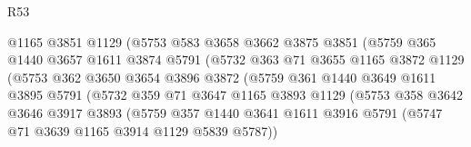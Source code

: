 \begin{lexlean}{R53}
\begin{coremodule}
                                @1165
                                @3851
                                @1129
                                (@5753
                                  @583
                                  @3658
                                  @3662
                                  @3875
                                  @3851
                                  (@5759
                                    @365
                                    @1440
                                    @3657
                                    @1611
                                    @3874
                                    @5791
                                    (@5732
                                      @363
                                      @71
                                      @3655
                                      @1165
                                      @3872
                                      @1129
                                      (@5753
                                        @362
                                        @3650
                                        @3654
                                        @3896
                                        @3872
                                        (@5759
                                          @361
                                          @1440
                                          @3649
                                          @1611
                                          @3895
                                          @5791
                                          (@5732
                                            @359
                                            @71
                                            @3647
                                            @1165
                                            @3893
                                            @1129
                                            (@5753
                                              @358
                                              @3642
                                              @3646
                                              @3917
                                              @3893
                                              (@5759
                                                @357
                                                @1440
                                                @3641
                                                @1611
                                                @3916
                                                @5791
                                                (@5747 @71 @3639 @1165 @3914 @1129 @5839 @5787))

\end{coremodule}
\end{lexlean}
